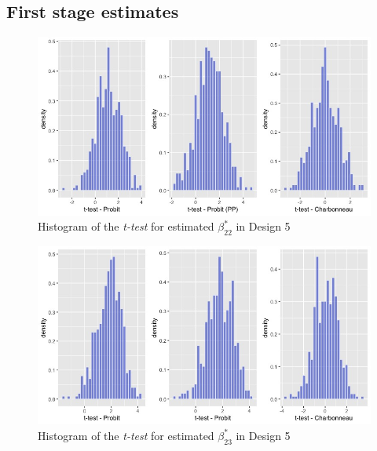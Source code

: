 \subsection{First stage estimates} \label{appendix_tables_figures} 
\begin{figure}[htbp]
    \begin{adjustwidth}{-.5in}{-.5in}
    \centerline{\includegraphics[scale=.4]{content/Figures/ttest_beta22_Design5.png}}
    \caption{\footnotesize{Histogram of the \textit{t-test} for estimated $\beta_{22}^*$ in Design 5}}
    \label{ttest_beta22_Design5}
    \end{adjustwidth}
\end{figure}
\begin{figure}[htbp]
    \vspace{-2.5em}%
    \begin{adjustwidth}{-.5in}{-.5in}
    \centerline{\includegraphics[scale=.4]{content/Figures/ttest_beta23_Design5.png}}
    \caption{\footnotesize{Histogram of the \textit{t-test} for estimated $\beta_{23}^*$ in Design 5}}
    \label{ttest_beta23_Design5}
\end{adjustwidth}
\end{figure}
